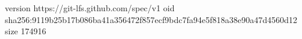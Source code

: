 version https://git-lfs.github.com/spec/v1
oid sha256:9119b25b17b086ba41a356472f857ecf9bdc7fa94e5f818a38e90a47d4560d12
size 174916

